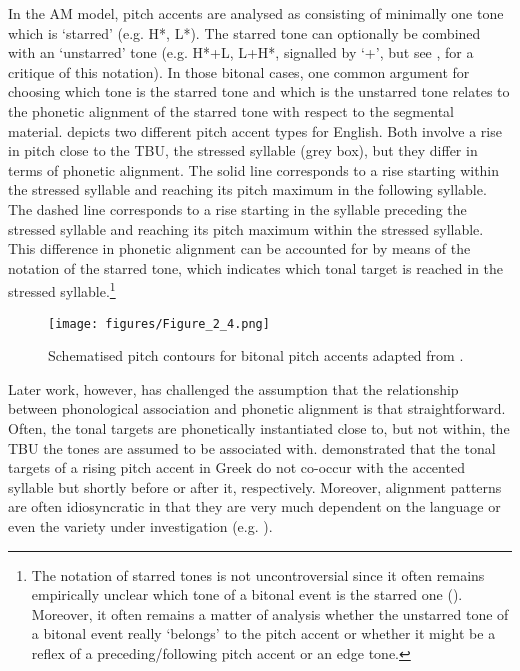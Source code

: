In the AM model, pitch accents are analysed as consisting of minimally one tone which is ‘starred’ (e.g. H*, L*). The starred tone can optionally be combined with an ‘unstarred’ tone (e.g. H*+L, L+H*, signalled by ‘+’, but see \citealt{Gussenhoven2002}, for a critique of this notation). In those bitonal cases, one common argument for choosing which tone is the starred tone and which is the unstarred tone relates to the phonetic alignment of the starred tone with respect to the segmental material.  depicts two different pitch accent types for English. Both involve a rise in pitch close to the TBU, the stressed syllable (grey box), but they differ in terms of phonetic alignment. The solid line corresponds to a rise starting within the stressed syllable and reaching its pitch maximum in the following syllable. The dashed line corresponds to a rise starting in the syllable preceding the stressed syllable and reaching its pitch maximum within the stressed syllable. This difference in phonetic alignment can be accounted for by means of the notation of the starred tone, which indicates which tonal target is reached in the stressed syllable.\footnote{The notation of starred tones is not uncontroversial since it often remains empirically unclear which tone of a bitonal event is the starred one (\citealt{Arvaniti.etal2000}). Moreover, it often remains a matter of analysis whether the unstarred tone of a bitonal event really ‘belongs’ to the pitch accent or whether it might be a reflex of a preceding/following pitch accent or an edge tone.}

\begin{figure}
  \centering 
   \texttt{[image: figures/Figure\_2\_4.png]}
  \caption{Schematised pitch contours for bitonal pitch accents adapted from \citet[782]{Grice2006}.} 
   \label{fig:2.4}
   \end{figure}

Later work, however, has challenged the assumption that the relationship between phonological association and phonetic alignment is that straightforward. Often, the tonal targets are phonetically instantiated close to, but not within, the TBU the tones are assumed to be associated with. \citet{Arvaniti.etal2000} demonstrated that the tonal targets of a rising pitch accent in Greek do not co-occur with the accented syllable but shortly before or after it, respectively. Moreover, alignment patterns are often idiosyncratic in that they are very much dependent on the language or even the variety under investigation (e.g. \citealt{Muecke.etal2009}). 

